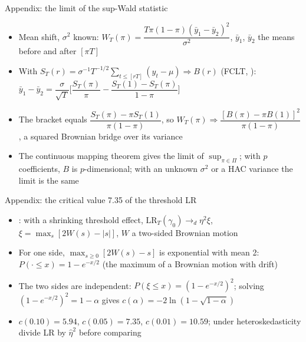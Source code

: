 \begin{frame}{Appendix: the limit of the sup-Wald statistic}
\hypertarget{atsapp1}{}
\itemsize{\small}
\begin{itemize}
    \item Mean shift, $\sigma^2$ known: $W_T(\pi) = \dfrac{T\pi(1 - \pi)(\bar y_1 - \bar y_2)^2}{\sigma^2}$, $\bar y_1$, $\bar y_2$ the means before and after $[\pi T]$
    \item With $S_T(r) = \sigma^{-1}T^{-1/2}\sum_{t \le [rT]}(y_t - \mu) \Rightarrow B(r)$ (FCLT, ): $\bar y_1 - \bar y_2 = \dfrac{\sigma}{\sqrt T}\Big[\dfrac{S_T(\pi)}{\pi} - \dfrac{S_T(1) - S_T(\pi)}{1 - \pi}\Big]$
    \item The bracket equals $\dfrac{S_T(\pi) - \pi S_T(1)}{\pi(1 - \pi)}$, so $W_T(\pi) \Rightarrow \dfrac{[B(\pi) - \pi B(1)]^2}{\pi(1 - \pi)}$, a squared Brownian bridge over its variance
    \item The continuous mapping theorem gives the limit of $\sup_{\pi \in \Pi}$; with $p$ coefficients, $B$ is $p$-dimensional; with an unknown $\sigma^2$ or a HAC variance the limit is the same
\end{itemize}
\end{frame}

\begin{frame}{Appendix: the critical value 7.35 of the threshold LR}
\hypertarget{atsapp2}{}
\itemsize{\small}
\begin{itemize}
    \item {}: with a shrinking threshold effect, $\mathrm{LR}_T(\gamma_0) \to_d \eta^2\xi$, $\xi = \max_{s}[2W(s) - |s|]$, $W$ a two-sided Brownian motion
    \item For one side, $\max_{s \ge 0}[2W(s) - s]$ is exponential with mean 2: $P(\cdot \le x) = 1 - e^{-x/2}$ (the maximum of a Brownian motion with drift)
    \item The two sides are independent: $P(\xi \le x) = (1 - e^{-x/2})^2$; solving $(1 - e^{-x/2})^2 = 1 - \alpha$ gives $c(\alpha) = -2\ln(1 - \sqrt{1 - \alpha})$
    \item $c(0.10) = 5.94$, $c(0.05) = 7.35$, $c(0.01) = 10.59$; under heteroskedasticity divide LR by $\hat\eta^2$ before comparing
\end{itemize}
\end{frame}

